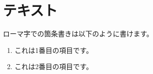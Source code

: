 \chapter{テキスト}
ローマ字での箇条書きは以下のように書けます。
\begin{enumerate}[i]
    \item これは1番目の項目です。
    \item これは2番目の項目です。
\end{enumerate}
